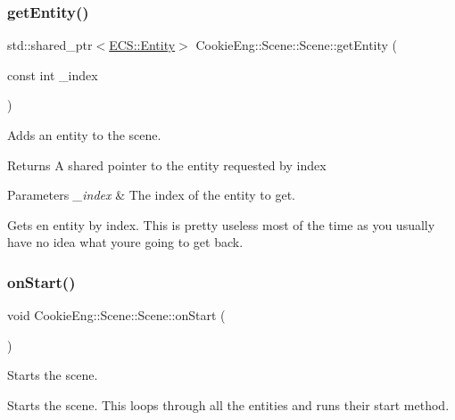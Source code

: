 \subsubsection{\texorpdfstring{get\+Entity()}{getEntity()}}
{\footnotesize\ttfamily std\+::shared\+\_\+ptr$<$\hyperlink{class_cookie_eng_1_1_e_c_s_1_1_entity}{E\+C\+S\+::\+Entity}$>$ Cookie\+Eng\+::\+Scene\+::\+Scene\+::get\+Entity (\begin{DoxyParamCaption}\item[{const int}]{\+\_\+index }\end{DoxyParamCaption})}



Adds an entity to the scene. 

\begin{DoxyReturn}{Returns}
A shared pointer to the entity requested by index 
\end{DoxyReturn}

\begin{DoxyParams}{Parameters}
{\em \+\_\+index} & The index of the entity to get.\\
\hline
\end{DoxyParams}
Gets en entity by index. This is pretty useless most of the time as you usually have no idea what you\textquotesingle{}re going to get back. \mbox{\label{class_cookie_eng_1_1_scene_1_1_scene_ab66ffdb5475b0045d0ce5a846488590c}} 
\subsubsection{\texorpdfstring{on\+Start()}{onStart()}}
{\footnotesize\ttfamily void Cookie\+Eng\+::\+Scene\+::\+Scene\+::on\+Start (\begin{DoxyParamCaption}{ }\end{DoxyParamCaption})}



Starts the scene. 

Starts the scene. This loops through all the entities and runs their start method. \mbox{\label{class_cookie_eng_1_1_scene_1_1_scene_a10fa9798a2d0cff5527a4ca160a5202f}} 
